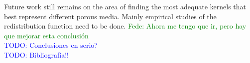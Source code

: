 \documentclass{CFD2011}
\newcommand{\TODO}[1]{\textcolor{blue}{TODO: #1} \\}
\newcommand{\Fede}[1]{\textcolor{green}{Fede: #1} \\}
\begin{document}
Future work still remains on the area of finding the most adequate kernels that best represent different porous media. Mainly empirical studies of the redistribution function need to be done.
\Fede{Ahora me tengo que ir, pero hay que mejorar esta conclusi\'on}
\TODO{Conclusiones en serio?}
\TODO{Bibliograf\'ia!!}
%
%
%
%
%
%
%
%
%
%
%
%
\end{document}
